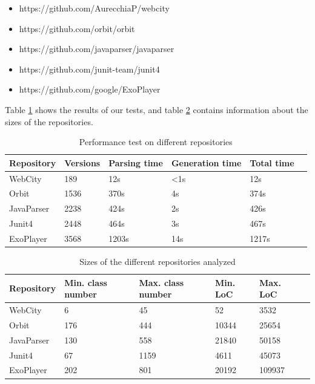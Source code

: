 \documentclass[]{usiinfbachelorproject}
\begin{document}
\begin{itemize}
    \item https://github.com/AurecchiaP/webcity
    \item https://github.com/orbit/orbit
    \item https://github.com/javaparser/javaparser
    \item https://github.com/junit-team/junit4
    \item https://github.com/google/ExoPlayer
\end{itemize}

Table \ref{tab:performance} shows the results of our tests, and table \ref{tab:performance2} contains information about the sizes of the repositories.

\begin{table}[H]
    \begin{center}
        \begin{tabular}{ | l | l | l | l | l | l |}
        \hline
        Repository & Versions & Parsing time & Generation time & Total time \\ \hline
        WebCity & 189 & 12s & <1s & 12s \\ \hline
        Orbit & 1536 & 370s & 4s & 374s \\ \hline
        JavaParser & 2238 & 424s & 2s & 426s \\ \hline
        Junit4 & 2448 & 464s & 3s & 467s \\ \hline
        ExoPlayer & 3568 & 1203s & 14s & 1217s \\ \hline
        \end{tabular}
    \end{center}
    \caption{Performance test on different repositories}
    \label{tab:performance}
\end{table}



\begin{table}[H]
    \begin{center}
        \begin{tabular}{ | l | l | l | l | l | l |}
        \hline
        Repository & Min. class number & Max. class number & Min. LoC & Max. LoC \\ \hline
        WebCity & 6 & 45 & 52 & 3532 \\ \hline
        Orbit & 176 & 444 & 10344 & 25654 \\ \hline
        JavaParser & 130 & 558 & 21840 & 50158 \\ \hline
        Junit4 & 67 & 1159 & 4611 & 45073 \\ \hline
        ExoPlayer & 202 & 801 & 20192 & 109937 \\ \hline
        \end{tabular}
    \end{center}
    \caption{Sizes of the different repositories analyzed}
    \label{tab:performance2}
\end{table}
\end{document}
